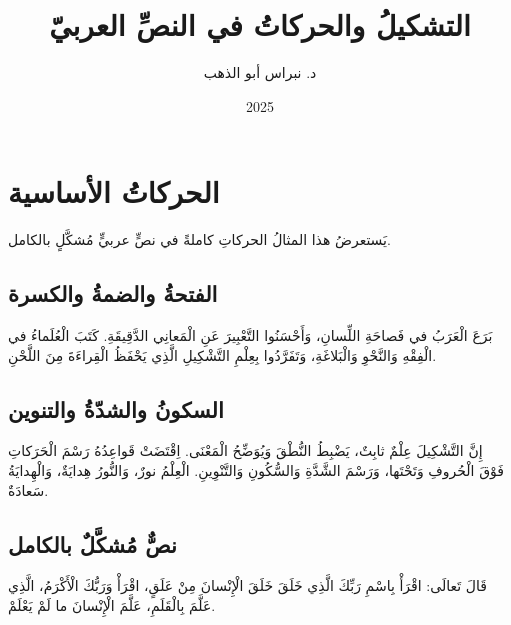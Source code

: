 \documentclass[12pt, a4paper]{article}
\begin{document}
\title{التشكيلُ والحركاتُ في النصِّ العربيّ}
\author{د. نبراس أبو الذهب}
\date{2025}
\maketitle

\section{الحركاتُ الأساسية}

يَستعرضُ هذا المثالُ الحركاتِ كاملةً في نصٍّ عربيٍّ مُشكَّلٍ بالكامل.

\subsection{الفتحةُ والضمةُ والكسرة}

بَرَعَ الْعَرَبُ في فَصاحَةِ اللِّسانِ، وَأَحْسَنُوا التَّعْبِيرَ عَنِ
الْمَعانِي الدَّقِيقَةِ. كَتَبَ الْعُلَماءُ في الْفِقْهِ وَالنَّحْوِ
وَالْبَلاغَةِ، وَتَفَرَّدُوا بِعِلْمِ التَّشْكِيلِ الَّذِي يَحْفَظُ
الْقِراءَةَ مِنَ اللَّحْنِ.

\subsection{السكونُ والشدّةُ والتنوين}

إِنَّ التَّشْكِيلَ عِلْمٌ ثابِتٌ، يَضْبِطُ النُّطْقَ وَيُوَضِّحُ
الْمَعْنَى. اِقْتَضَتْ قَواعِدُهُ رَسْمَ الْحَرَكاتِ فَوْقَ الْحُروفِ
وَتَحْتَها، وَرَسْمَ الشَّدَّةِ وَالسُّكُونِ وَالتَّنْوِينِ.
الْعِلْمُ نورٌ، وَالنُّورُ هِدايَةٌ، وَالْهِدايَةُ سَعادَةٌ.

\subsection{نصٌّ مُشكَّلٌ بالكامل}

قَالَ تَعالَى: اقْرَأْ بِاسْمِ رَبِّكَ الَّذِي خَلَقَ
خَلَقَ الْإِنْسانَ مِنْ عَلَقٍ، اقْرَأْ وَرَبُّكَ الْأَكْرَمُ،
الَّذِي عَلَّمَ بِالْقَلَمِ، عَلَّمَ الْإِنْسانَ ما لَمْ يَعْلَمْ.
\end{document}
